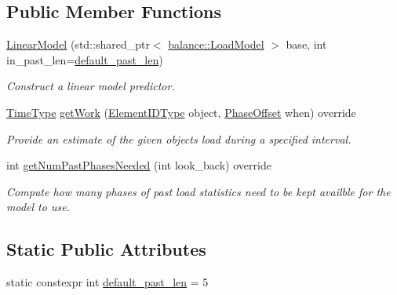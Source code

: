 \subsection*{Public Member Functions}
\begin{DoxyCompactItemize}
\item 
\hyperlink{structvt_1_1vrt_1_1collection_1_1balance_1_1_linear_model_a5635a178ad9efde93b96d5f44e849175}{Linear\+Model} (std\+::shared\+\_\+ptr$<$ \hyperlink{classvt_1_1vrt_1_1collection_1_1balance_1_1_load_model}{balance\+::\+Load\+Model} $>$ base, int in\+\_\+past\+\_\+len=\hyperlink{structvt_1_1vrt_1_1collection_1_1balance_1_1_linear_model_a17d295e933227905ba94ea69f1cbfb64}{default\+\_\+past\+\_\+len})
\begin{DoxyCompactList}\small\item\em Construct a linear model predictor. \end{DoxyCompactList}\item 
\hyperlink{namespacevt_a876a9d0cd5a952859c72de8a46881442}{Time\+Type} \hyperlink{structvt_1_1vrt_1_1collection_1_1balance_1_1_linear_model_a21150f198d266175ea015c0caebad5b5}{get\+Work} (\hyperlink{namespacevt_1_1vrt_1_1collection_1_1balance_a14c8d2c972f2913aa3f1636e5be0a120}{Element\+I\+D\+Type} object, \hyperlink{structvt_1_1vrt_1_1collection_1_1balance_1_1_phase_offset}{Phase\+Offset} when) override
\begin{DoxyCompactList}\small\item\em Provide an estimate of the given object\textquotesingle{}s load during a specified interval. \end{DoxyCompactList}\item 
int \hyperlink{structvt_1_1vrt_1_1collection_1_1balance_1_1_linear_model_af21543dccfa23d2843a3b95b1ec15653}{get\+Num\+Past\+Phases\+Needed} (int look\+\_\+back) override
\begin{DoxyCompactList}\small\item\em Compute how many phases of past load statistics need to be kept availble for the model to use. \end{DoxyCompactList}\end{DoxyCompactItemize}
\subsection*{Static Public Attributes}
\begin{DoxyCompactItemize}
\item 
static constexpr int \hyperlink{structvt_1_1vrt_1_1collection_1_1balance_1_1_linear_model_a17d295e933227905ba94ea69f1cbfb64}{default\+\_\+past\+\_\+len} = 5
\end{DoxyCompactItemize}

